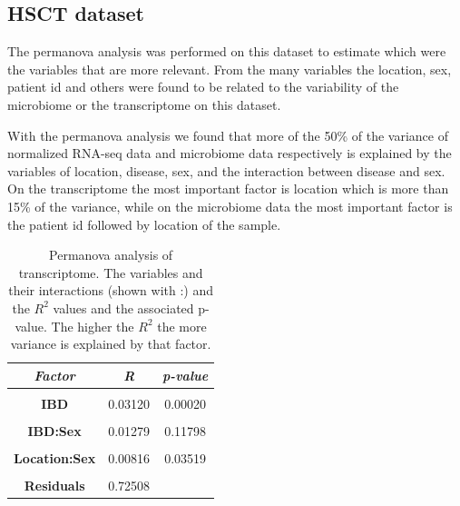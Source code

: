 \documentclass[
  12pt,
  a4paper,
  twoside,
  openright]{book}
\begin{document}
\hypertarget{results-hsct}{%
\subsection{HSCT dataset}\label{results-hsct}}

The permanova analysis was performed on this dataset to estimate which were the variables that are more relevant.
From the many variables the location, sex, patient id and others were found to be related to the variability of the microbiome or the transcriptome on this dataset.

With the permanova analysis we found that more of the 50\% of the variance of normalized RNA-seq data and microbiome data respectively is explained by the variables of location, disease, sex, and the interaction between disease and sex.
On the transcriptome the most important factor is location which is more than 15\% of the variance, while on the microbiome data the most important factor is the patient id followed by location of the sample.

\begin{table}[H]

\caption[Permanova analysis of transcriptome.]{\label{tab:hsct-permanova-rnaseq}Permanova analysis of transcriptome. The variables and their interactions (shown with :) and the $R^2$ values and the associated p-value. The higher the $R^2$ the more variance is explained by that factor.}
\centering
\begin{tabular}[t]{|>{}c|c|>{}c|}
\hline
\em{\textbf{Factor}} & \em{\textbf{R}} & \em{\textbf{p-value}}\\
\hline
\textbf{\cellcolor{gray!6}{Location}} & \cellcolor{gray!6}{0.18057} & \cellcolor{gray!6}{0.00020}\\
\hline
\textbf{IBD} & 0.03120 & 0.00020\\
\hline
\textbf{\cellcolor{gray!6}{Sex}} & \cellcolor{gray!6}{0.01306} & \cellcolor{gray!6}{0.00120}\\
\hline
\textbf{IBD:Sex} & 0.01279 & 0.11798\\
\hline
\textbf{\cellcolor{gray!6}{Location:IBD}} & \cellcolor{gray!6}{0.02427} & \cellcolor{gray!6}{0.11458}\\
\hline
\textbf{Location:Sex} & 0.00816 & 0.03519\\
\hline
\textbf{\cellcolor{gray!6}{Location:IBD:Sex}} & \cellcolor{gray!6}{0.00486} & \cellcolor{gray!6}{0.52190}\\
\hline
\textbf{Residuals} & 0.72508 & \\
\hline
\end{tabular}
\end{table}
\end{document}
